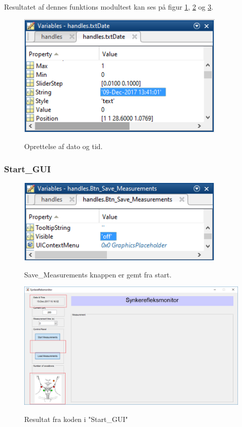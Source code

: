 Resultatet af dennes funktions modultest kan ses på figur \ref{fig:modulteststartGUI1}, \ref{fig:modulteststartGUI2} og \ref{fig:modultestGUI}.


\begin{figure}[H] 
\centering
{\includegraphics[width=10cm]
{Figure/modulteststartGUI1}}
\caption{Oprettelse af dato og tid.}
\label{fig:modulteststartGUI1}
\end{figure}


\subsubsection{Start\_GUI} 
\begin{figure}[H] 
\centering
{\includegraphics[width=10cm]
{Figure/modulteststartGUI2}}
\caption{Save\_Measurements knappen er gemt fra start.}
\label{fig:modulteststartGUI2}
\end{figure}



\begin{figure}[H] 
\centering
{\includegraphics[width=\linewidth]
{Figure/modultestGUI}}
\caption{Resultat fra koden i "Start\_GUI"}
\label{fig:modultestGUI}
\end{figure}


